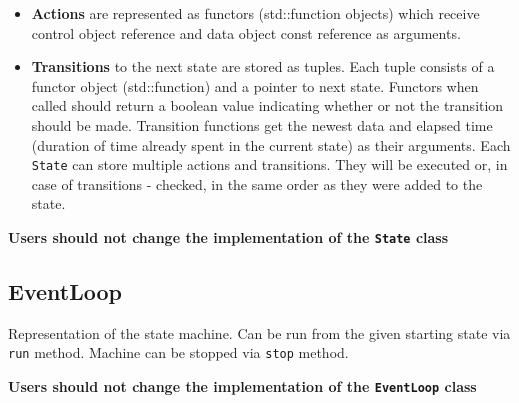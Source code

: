 \documentclass{article}
\begin{document}
\begin{itemize}
\item
  \textbf{Actions} are represented as functors (std::function objects)
  which receive control object reference and data object const reference
  as arguments.
\item
  \textbf{Transitions} to the next state are stored as tuples. Each
  tuple consists of a functor object (std::function) and a pointer to
  next state. Functors when called should return a boolean value
  indicating whether or not the transition should be made. Transition
  functions get the newest data and elapsed time (duration of time
  already spent in the current state) as their arguments. Each
  \texttt{State} can store multiple actions and transitions. They will
  be executed or, in case of transitions - checked, in the same order as
  they were added to the state.
\end{itemize}

\textbf{Users should not change the implementation of the \texttt{State}
class}

\subsection*{EventLoop}\label{eventloop}

Representation of the state machine. Can be run from the given starting
state via \texttt{run} method. Machine can be stopped via \texttt{stop}
method.

\textbf{Users should not change the implementation of the
\texttt{EventLoop} class}
\end{document}
